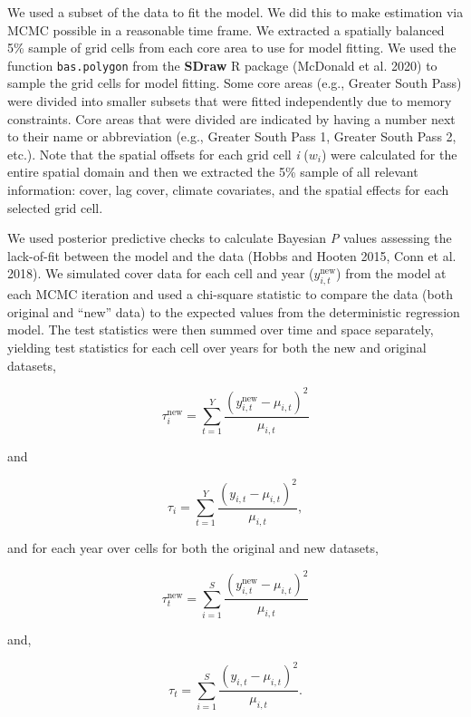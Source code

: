\documentclass[
  12pt,
]{article}
\begin{document}
We used a subset of the data to fit the model.
We did this to make estimation via MCMC possible in a reasonable time frame.
We extracted a spatially balanced 5\% sample of grid cells from each core area to use for model fitting.
We used the function \texttt{bas.polygon} from the \textbf{SDraw} R package (McDonald et al. 2020) to sample the grid cells for model fitting.
Some core areas (e.g., Greater South Pass) were divided into smaller subsets that were fitted independently due to memory constraints.
Core areas that were divided are indicated by having a number next to their name or abbreviation (e.g., Greater South Pass 1, Greater South Pass 2, etc.).
Note that the spatial offsets for each grid cell \emph{i} (\(w_i\)) were calculated for the entire spatial domain and then we extracted the 5\% sample of all relevant information: cover, lag cover, climate covariates, and the spatial effects for each selected grid cell.

We used posterior predictive checks to calculate Bayesian \emph{P} values assessing the lack-of-fit between the model and the data (Hobbs and Hooten 2015, Conn et al. 2018).
We simulated cover data for each cell and year (\(y^{\text{new}}_{i,t}\)) from the model at each MCMC iteration and used a chi-square statistic to compare the data (both original and ``new'' data) to the expected values from the deterministic regression model.
The test statistics were then summed over time and space separately, yielding test statistics for each cell over years for both the new and original datasets,

\begin{equation}
\tau^{\text{new}}_i = \sum^Y_{t=1} \frac{\left(y^{\text{new}}_{i,t} - \mu_{i,t}\right)^2}{\mu_{i,t}}    
\end{equation}

\noindent{}and

\begin{equation}
\tau_i = \sum^Y_{t=1} \frac{\left(y_{i,t} - \mu_{i,t}\right)^2}{\mu_{i,t}},    
\end{equation}

\noindent{}and for each year over cells for both the original and new datasets,

\begin{equation}
\tau^{\text{new}}_t = \sum^S_{i=1} \frac{\left(y^{\text{new}}_{i,t} - \mu_{i,t}\right)^2}{\mu_{i,t}}    
\end{equation}

\noindent{}and,

\begin{equation}
\tau_t = \sum^S_{i=1} \frac{\left(y_{i,t} - \mu_{i,t}\right)^2}{\mu_{i,t}}.    
\end{equation}
\end{document}
